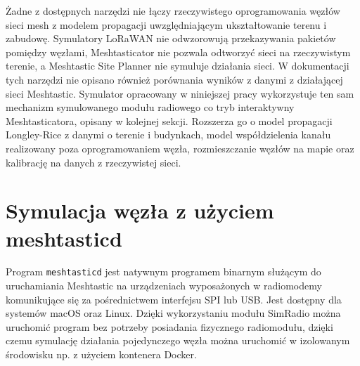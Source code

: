 \documentclass[12pt,a4paper,twoside]{report}
\theoremstyle{definition} %
\begin{document}
Żadne z dostępnych narzędzi nie łączy rzeczywistego oprogramowania węzłów sieci mesh z modelem propagacji uwzględniającym ukształtowanie terenu i zabudowę. Symulatory LoRaWAN nie odwzorowują przekazywania pakietów pomiędzy węzłami, Meshtasticator nie pozwala odtworzyć sieci na rzeczywistym terenie, a Meshtastic Site Planner nie symuluje działania sieci. W dokumentacji tych narzędzi nie opisano również porównania wyników z danymi z działającej sieci Meshtastic. Symulator opracowany w niniejszej pracy wykorzystuje ten sam mechanizm symulowanego modułu radiowego co tryb interaktywny Meshtasticatora, opisany w kolejnej sekcji. Rozszerza go o model propagacji Longley-Rice z danymi o terenie i budynkach, model współdzielenia kanału realizowany poza oprogramowaniem węzła, rozmieszczanie węzłów na mapie oraz kalibrację na danych z rzeczywistej sieci.

\section{Symulacja węzła z użyciem meshtasticd}
Program \texttt{meshtasticd} jest natywnym programem binarnym służącym do uruchamiania Meshtastic na urządzeniach wyposażonych w radiomodemy komunikujące się za pośrednictwem interfejsu SPI lub USB. Jest dostępny dla systemów macOS oraz Linux. Dzięki wykorzystaniu modułu SimRadio można uruchomić program bez potrzeby posiadania fizycznego radiomodułu, dzięki czemu symulację działania pojedynczego węzła można uruchomić w izolowanym środowisku np. z użyciem kontenera Docker.

\cleardoublepage


\cleardoublepage


\cleardoublepage


    \cleardoublepage
    
\end{document}
